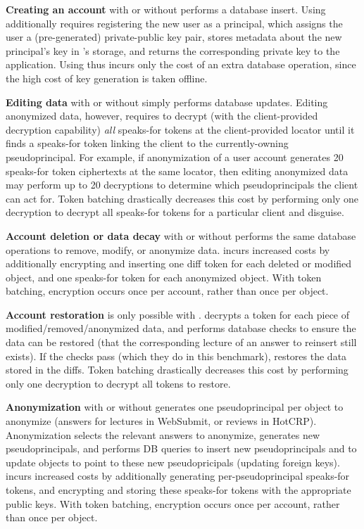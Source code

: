 \textbf{Creating an account} with or without \sys performs a database insert. Using \sys additionally
requires registering the new user as a principal, which assigns the user a (pre-generated)
private-public key pair, stores metadata about the new principal's key in \sys's storage, and
returns the corresponding private key to the application.
Using \sys thus incurs only the cost of an extra database operation, since the high cost of key
generation is taken offline.

\textbf{Editing data} with or without \sys simply performs database updates. Editing anonymized
data, however, requires \sys to decrypt (with the client-provided decryption capability) \emph{all}
speaks-for tokens at the client-provided locator until it finds a speaks-for token linking the
client to the currently-owning pseudoprincipal.  For example, if anonymization of a user account
generates 20 speaks-for token ciphertexts at the same locator, then editing anonymized data may
perform up to 20 decryptions to determine which pseudoprincipals the client can act for.  Token
batching drastically decreases this cost by performing only one decryption to decrypt all speaks-for
tokens for a particular client and disguise.

\textbf{Account deletion or data decay} with or without \sys performs the same database operations to
remove, modify, or anonymize data. \sys incurs increased costs by additionally encrypting and
inserting one diff token for each deleted or modified object, and one speaks-for token for each
anonymized object. 
With token batching, encryption occurs once per account, rather than once per object. 

\textbf{Account restoration} is only possible with \sys. \sys decrypts a token for each
piece of modified/removed/anonymized data, and performs database checks to ensure the data can be restored
(\eg that the corresponding lecture of an answer to reinsert still exists). If the checks pass
(which they do in this benchmark), \sys restores the data stored in the diffs. 
Token batching drastically decreases this cost by performing only one decryption to decrypt all 
tokens to restore.

\textbf{Anonymization} with or without \sys generates one pseudoprincipal per object to anonymize
(\eg answers for lectures in WebSubmit, or reviews in HotCRP). Anonymization selects the relevant answers
to anonymize, generates new pseudoprincipals, and performs DB queries to insert new pseudoprincipals
and to update objects to point to these new pseudopricipals (\eg updating foreign keys).
\sys incurs increased costs by additionally generating per-pseudoprincipal speaks-for tokens, and 
encrypting and storing these speaks-for tokens with the appropriate public keys.
With token batching, encryption occurs once per account, rather than once per object. 


